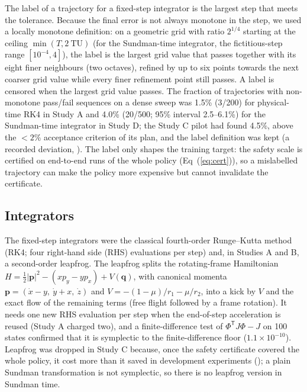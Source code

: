 \documentclass[10pt,letterpaper]{article}
\begin{document}
The label of a trajectory for a fixed-step integrator is the largest step that meets the tolerance. Because the final error is not always monotone in the step, we used a locally monotone definition: on a geometric grid with ratio $2^{1/4}$ starting at the ceiling $\min(T, 2\ \mathrm{TU})$ (for the Sundman-time integrator, the fictitious-step range $[10^{-4}, 4]$), the label is the largest grid value that passes together with its eight finer neighbours (two octaves), refined by up to six points towards the next coarser grid value while every finer refinement point still passes. A label is censored when the largest grid value passes. The fraction of trajectories with non-monotone pass/fail sequences on a dense sweep was 1.5\% (3/200) for physical-time RK4 in Study A and 4.0\% (20/500; 95\% interval 2.5--6.1\%) for the Sundman-time integrator in Study D; the Study C pilot had found 4.5\%, above the $<2\%$ acceptance criterion of its plan, and the label definition was kept (a recorded deviation, ). The label only shapes the training target: the safety scale is certified on end-to-end runs of the whole policy (Eq~(\ref{eq:cert})), so a mislabelled trajectory can make the policy more expensive but cannot invalidate the certificate.

\subsection*{Integrators}
The fixed-step integrators were the classical fourth-order Runge--Kutta method (RK4; four right-hand side (RHS) evaluations per step) and, in Studies A and B, a second-order leapfrog. The leapfrog splits the rotating-frame Hamiltonian $H = \tfrac{1}{2}|\boldsymbol{p}|^{2} - (x p_{y} - y p_{x}) + V(\boldsymbol{q})$, with canonical momenta $\boldsymbol{p} = (\dot{x}-y,\ \dot{y}+x,\ \dot{z})$ and $V = -(1-\mu)/r_{1} - \mu/r_{2}$, into a kick by $V$ and the exact flow of the remaining terms (free flight followed by a frame rotation). It needs one new RHS evaluation per step when the end-of-step acceleration is reused (Study A charged two), and a finite-difference test of $\Phi^{\mathsf{T}} J \Phi - J$ on 100 states confirmed that it is symplectic to the finite-difference floor ($1.1\times10^{-10}$). Leapfrog was dropped in Study C because, once the safety certificate covered the whole policy, it cost more than it saved in development experiments (); a plain Sundman transformation is not symplectic, so there is no leapfrog version in Sundman time.
\end{document}
